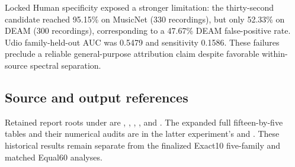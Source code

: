 Locked Human specificity exposed a stronger limitation: the thirty-second
candidate reached 95.15\% on MusicNet (330 recordings), but only 52.33\%
on DEAM (300 recordings), corresponding to a 47.67\% DEAM false-positive
rate. Udio family-held-out AUC was 0.5479 and sensitivity 0.1586. These
failures preclude a reliable general-purpose attribution claim despite
favorable within-source spectral separation.

\subsection{Source and output references}

\begingroup\raggedright
Retained report roots under  are
,
,
,
, and
.
The expanded full fifteen-by-five tables and their numerical audits are in
the latter experiment's  and
. These historical results remain
separate from the finalized Exact10 five-family and matched Equal60 analyses.
\par\endgroup
